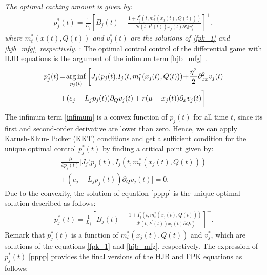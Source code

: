 \documentclass{book}
\DeclareMathOperator*{\arginf}{\arg\inf}
\begin{document}
    \vskip 10pt
      {\it The optimal caching amount is given by: }
    \begin{eqnarray}
    p_{j}^*(t)=\frac{1}{L_j}\left[B_{j}(t)- \frac{1+I^r_j(t,m^*_t(x_j(t),Q(t)))}{\mathcal{R}(t,I^f(t)) x_j(t)\partial{\scriptscriptstyle 
     {Q}}{v^*_{j}}}    \right]^+,  \label{Propo1}
     \end{eqnarray}
     {\it where $m_t^*(x(t),Q(t))$ and $v_j^*(t)$ are the  solutions of  \eqref{fpk_1} and \eqref{hjb_mfg}, respectively. }  
     \vskip 10pt
    : The optimal control control of the differential game with HJB equations  is the argument of the infimum term \eqref{hjb_mfg}~\cite{exist_HJBsol1}.
    \begin{align}
    p_j^*(t)&\!=\!\arginf\limits_{p_{j}(t)} \bigg{[}J_{j}(p_{j}(t),\!I_j(t,m_t^*(x_j(t),Q(t)))\!+\! \frac{\eta^2}{2}\partial_{xx}^2 v_{j}(t)\nonumber \\
     &+\! (e_j -L_j p_{j}(t)) \partial_{Q}v_{j}(t)+r(\mu-x_j(t))\partial_x v_{j}(t)\bigg{]} \label{infimum}
    \end{align}
    The infimum term \eqref{infimum} is a convex function of $p_j(t)$ for all time $t$, since its first and second-order derivative are lower than zero. Hence, we can apply Karush-Khun-Tucker (KKT) conditions and get a sufficient condition for the unique optimal control $p_j^*(t)$ by finding a critical point given by:
    \begin{align}
    \frac{\partial}{\partial p_j(t)} \big[J_{j}(p_{j}(t),I_j(t,m_t^*(x_j(t),Q(t))) \nonumber\\
    + (e_j -L_j p_{j}(t)) \partial_{Q}v_{j}(t) \big]= 0.\label{pppp}
    \end{align}
    Due to the convexity, the solution of equation \eqref{pppp} is the unique optimal solution described as follows:
    \begin{align}
    p_{j}^*(t)=\frac{1}{L_j}\left[B_{j}(t)- \frac{1+I^r_j(t,m^*_t(x_j(t),Q(t)))}{\mathcal{R}(t,I^f(t)) x_j(t)\partial{\scriptscriptstyle 
     {Q}}{v^*_{j}}}    \right]^+.
    \end{align}
    Remark that $p^*_j(t)$ is a function of $m^*_t(x_j(t),Q(t))$ and $v^*_{j}$, which are solutions of the equations \eqref{fpk_1} and \eqref{hjb_mfg}, respectively.
    The expression of $p_j^*(t)$ \eqref{pppp} provides the final versions of the HJB and FPK equations as follows:
    
\end{document}
